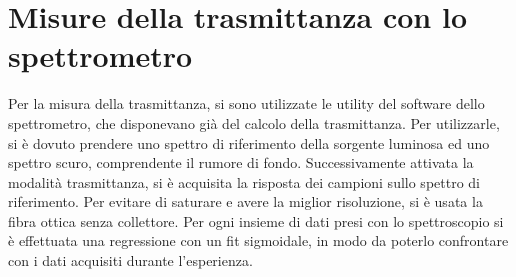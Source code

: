 \documentclass[11pt]{article} %
\begin{document}
\section{Misure della trasmittanza con lo spettrometro}
Per la misura della trasmittanza, si sono utilizzate le utility del software dello spettrometro, che disponevano già del calcolo della trasmittanza. Per utilizzarle, si è dovuto prendere uno spettro di riferimento della sorgente luminosa ed uno spettro scuro, comprendente il rumore di fondo. Successivamente attivata la modalità trasmittanza, si è acquisita la risposta dei campioni sullo spettro di riferimento. Per evitare di saturare e avere la miglior risoluzione, si è usata la fibra ottica senza collettore. Per ogni insieme di dati presi con lo spettroscopio si è effettuata una regressione con un fit sigmoidale, in modo da poterlo confrontare con i dati acquisiti durante l'esperienza.
\end{document}
